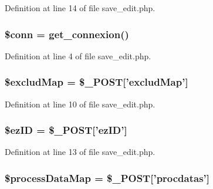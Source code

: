Definition at line 14 of file save\-\_\-edit.\-php.

\hypertarget{save__edit_8php_aa8a5a87b9c1a6a0819b88447cbe41877}{
\subsubsection[{\$conn}]{\setlength{\rightskip}{0pt plus 5cm}\$conn = {\bf get\-\_\-connexion}()}}\label{save__edit_8php_aa8a5a87b9c1a6a0819b88447cbe41877}


Definition at line 4 of file save\-\_\-edit.\-php.

\hypertarget{save__edit_8php_a296195c83717b71c16843c3c951e29a2}{
\subsubsection[{\$exclud\-Map}]{\setlength{\rightskip}{0pt plus 5cm}\$exclud\-Map = \$\-\_\-\-P\-O\-S\-T\mbox{[}'exclud\-Map'\mbox{]}}}\label{save__edit_8php_a296195c83717b71c16843c3c951e29a2}


Definition at line 10 of file save\-\_\-edit.\-php.

\hypertarget{save__edit_8php_addb1ec3ba55e413a08cb006ce21974df}{
\subsubsection[{\$ez\-I\-D}]{\setlength{\rightskip}{0pt plus 5cm}\${\bf ez\-I\-D} = \$\-\_\-\-P\-O\-S\-T\mbox{[}'{\bf ez\-I\-D}'\mbox{]}}}\label{save__edit_8php_addb1ec3ba55e413a08cb006ce21974df}


Definition at line 13 of file save\-\_\-edit.\-php.

\hypertarget{save__edit_8php_afa1bf54e96740365ed27d1d6e502ebe6}{
\subsubsection[{\$process\-Data\-Map}]{\setlength{\rightskip}{0pt plus 5cm}\$process\-Data\-Map = \$\-\_\-\-P\-O\-S\-T\mbox{[}'procdatas'\mbox{]}}}\label{save__edit_8php_afa1bf54e96740365ed27d1d6e502ebe6}



